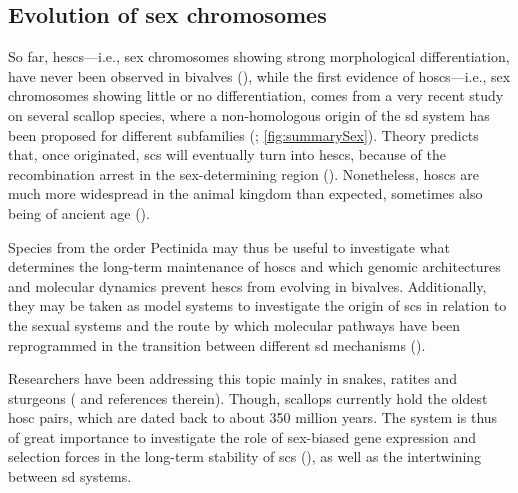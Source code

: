 \subsection{Evolution of sex chromosomes}
So far, \glspl{hesc}---i.e., sex chromosomes showing strong morphological differentiation, have never been observed in bivalves (), while the first evidence of \glspl{hosc}---i.e., sex chromosomes showing little or no differentiation, comes from a very recent study on several scallop species, where a non-homologous origin of the \gls{sd} system has been proposed for different subfamilies (; \cref{fig:summarySex}). Theory predicts that, once originated, \glspl{sc} will eventually turn into \glspl{hesc}, because of the recombination arrest in the sex-determining region (). Nonetheless, \glspl{hosc} are much more widespread in the animal kingdom than expected, sometimes also being of ancient age ().

Species from the order Pectinida may thus be useful to investigate what determines the long-term maintenance of \glspl{hosc} and which genomic architectures and molecular dynamics prevent \glspl{hesc} from evolving in bivalves. Additionally, they may be taken as model systems to investigate the origin of \glspl{sc} in relation to the sexual systems and the route by which molecular pathways have been reprogrammed in the transition between different \gls{sd} mechanisms ().

Researchers have been addressing this topic mainly in snakes, ratites and sturgeons ( and references therein). Though, scallops currently hold the oldest \gls{hosc} pairs, which are dated back to about 350 million years. The system is thus of great importance to investigate the role of sex-biased gene expression and selection forces in the long-term stability of \glspl{sc} (), as well as the intertwining between \gls{sd} systems.

